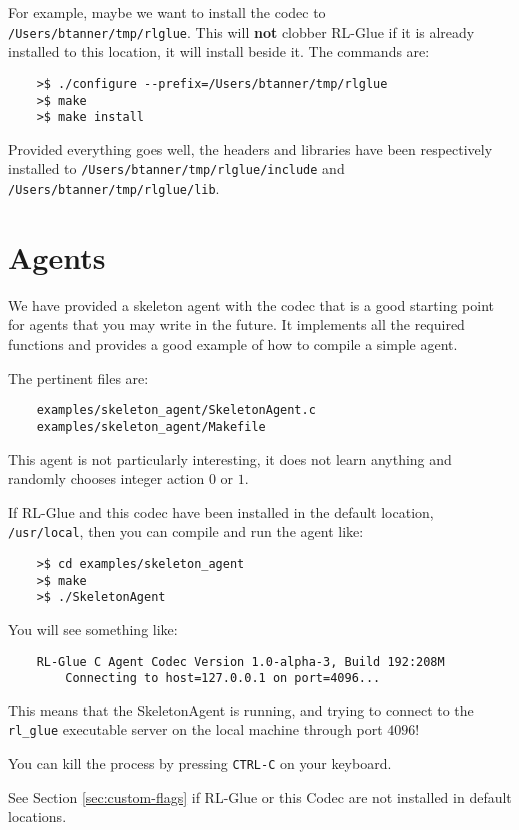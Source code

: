 \documentclass[11pt]{article}
\begin{document}
For example, maybe we want to install the codec to \texttt{/Users/btanner/tmp/rlglue}.  This will \textbf{not} clobber RL-Glue if it is already installed to this location, it will install beside it.  The commands are:
\begin{verbatim}
	>$ ./configure --prefix=/Users/btanner/tmp/rlglue
	>$ make
	>$ make install
\end{verbatim}

Provided everything goes well, the headers and libraries have been respectively installed to\newline
\texttt{/Users/btanner/tmp/rlglue/include} and \texttt{/Users/btanner/tmp/rlglue/lib}.




\section{Agents}
\label{sec:agent}
We have provided a skeleton agent with the codec that is a good starting point for agents that you may write in the future.
It implements all the required functions and provides a good example of how to compile a simple agent.

The pertinent files are:
\begin{verbatim}
	examples/skeleton_agent/SkeletonAgent.c
	examples/skeleton_agent/Makefile
\end{verbatim}

This agent is not particularly interesting, it does not learn anything and randomly chooses integer action $0$ or $1$.  

If RL-Glue and this codec have been installed in the default location, \texttt{/usr/local}, then you can compile and run the agent like:
\begin{verbatim}
	>$ cd examples/skeleton_agent
	>$ make
	>$ ./SkeletonAgent
\end{verbatim}

You will see something like:
\begin{verbatim}
	RL-Glue C Agent Codec Version 1.0-alpha-3, Build 192:208M
		Connecting to host=127.0.0.1 on port=4096...
\end{verbatim}

This means that the SkeletonAgent is running, and trying to connect to the \texttt{rl\_glue} executable server on the local machine through port $4096$! 

You can kill the process by pressing \texttt{CTRL-C} on your keyboard.

See Section \ref{sec:custom-flags} if RL-Glue or this Codec are not installed in default locations.
\end{document}
